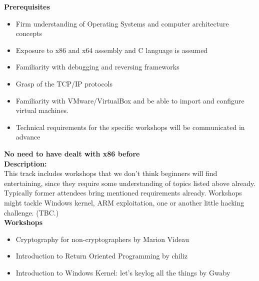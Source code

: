 \def\abstracttitle{Reversing all the things (Intermediate / Advanced)}
\def\abstractcomment{Track 3: on-my-way-to-rock-as-hell}
\def\abstractowner{Various}

\thispagestyle{abstract}

  \textbf{Prerequisites}
  \begin{itemize}
  	\item Firm understanding of Operating Systems and computer architecture concepts
    \item Exposure to x86 and x64 assembly and C language is assumed
    \item Familiarity with debugging and reversing frameworks
    \item Grasp of the TCP/IP protocols
    \item Familiarity with VMware/VirtualBox and be able to import and configure virtual machines.
    \item Technical requirements for the specific workshops will be communicated in advance
  \end{itemize}

  \textbf{No need to have dealt with x86 before}\\

  \textbf{Description:}\\

  This track includes workshops that we don't think beginners will find entertaining, since they require some understanding of topics listed above already. Typically former attendees bring mentioned requirements already. Workshops might tackle Windows kernel, ARM exploitation, one or another little hacking challenge. (TBC.)\\

  \textbf{Workshops}
  \begin{itemize}
    \item Cryptography for non-cryptographers by Marion Videau
    \item Introduction to Return Oriented Programming by chiliz
    \item Introduction to Windows Kernel: let’s keylog all the things by Gwaby
  \end{itemize}
